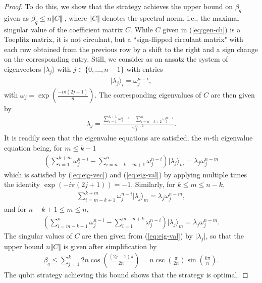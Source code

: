 \documentclass[pra,twocolumn,showpacs,preprintnumbers,amsmath,amssymb,superscriptaddress]{revtex4-1}
\begin{document}
\begin{appendix}
\begin{proof}
To do this, we show that the strategy achieves the upper bound on $\beta_q$ given as $\beta_q \leq n \Vert C \Vert$ \cite{Wehner2006, RaviAugusiakMurta2016, Linden2007}, where $\Vert C \Vert$ denotes the spectral norm, i.e., the maximal singular value of the coefficient matrix $C$. While $C$ given in (\ref{eq:gen-ch}) is a Toeplitz matrix, it is not circulant, but a ``sign-flipped circulant matrix" with each row obtained from the previous row by a shift to the right and a sign change on the corresponding entry. Still, we consider as an ansatz the system of eigenvectors $| \lambda_j \rangle$ with $j  \in \{0, \dots, n-1\}$ with entries
\begin{eqnarray}
\label{eq:eig-vec}
| \lambda_{j} \rangle_{i} = \omega_{j}^{n-i},
\end{eqnarray}
with $\omega_j = \exp{\left(\frac{-i \pi(2j+1)}{n}\right)}$. The corresponding eigenvalues of $C$ are then given by 
\begin{eqnarray}
\label{eq:eig-val}
\lambda_j = \frac{\sum_{i=1}^{k+1} \omega_j^{n-i} - \sum_{i=n-k+2}^{n} \omega_j^{n-i}}{\omega_j^{n-1}}.
\end{eqnarray}
It is readily seen that the eigenvalue equations are satisfied, the $m$-th eigenvalue equation being, for $m \leq k-1$
\begin{eqnarray}
\left(\sum_{i=1}^{k+m} \omega_j^{n-i} - \sum_{i=n-k+m+1}^{n} \omega_j^{n-i} \right) |\lambda_{j} \rangle_m = \lambda_j \omega_j^{n-m} 
\end{eqnarray}
which is satisfied by (\ref{eq:eig-vec}) and (\ref{eq:eig-val}) by applying multiple times the identity $\exp{\left(-i \pi (2j+1)\right)} = -1$. Similarly, for $k \leq m \leq n-k$,
\begin{eqnarray}
\sum_{i=m-k+1}^{k+m} \omega_j^{n-i}  |\lambda_{j} \rangle_m = \lambda_j \omega_j^{n-m}, 
\end{eqnarray}
and for $n-k+1 \leq m \leq n$,
\begin{eqnarray}
\left(\sum_{i=m-k+1}^{n} \omega_j^{n-i} - \sum_{i=1}^{m-n+k} \omega_j^{n-i} \right) |\lambda_{j} \rangle_m = \lambda_j \omega_j^{n-m}. 
\end{eqnarray}
The singular values of $C$ are then given from (\ref{eq:eig-val}) by $\vert \lambda_j \vert$, so that the upper bound $n \Vert C \Vert$ is given after simplification by 
\begin{eqnarray}
\beta_q \leq \sum_{j=1}^{k} 2 n \cos{\left(\frac{(2j-1) \pi}{2n} \right)} = n \csc{\left(\frac{\pi}{2n} \right)} \sin{\left(\frac{k\pi}{n} \right)}.
\end{eqnarray} 
The qubit strategy achieving this bound shows that the strategy is optimal. 
\end{proof}


\end{appendix}
\end{document}
